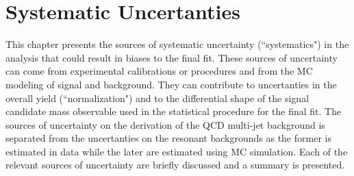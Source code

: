 \chapter{Systematic Uncertanties} \label{chap:systematics}

This chapter presents the sources of systematic uncertainty (``systematics") in
the analysis that could result in biases to the final fit.  These sources of
uncertainty can come from experimental calibrations or procedures and from the
MC modeling of signal and background. They can contribute to uncertanties in
the overall yield (``normalization") and to the differential shape of the
signal candidate mass observable used in the statistical procedure for the
final fit.  The sources of uncertainty on the derivation of the QCD multi-jet
background is separated from the uncertanties on the resonant backgrounds as
the former is estimated in data while the later are estimated using MC
simulation.  Each of the relevant sources of uncertainty are briefly discussed
and a summary is presented.




